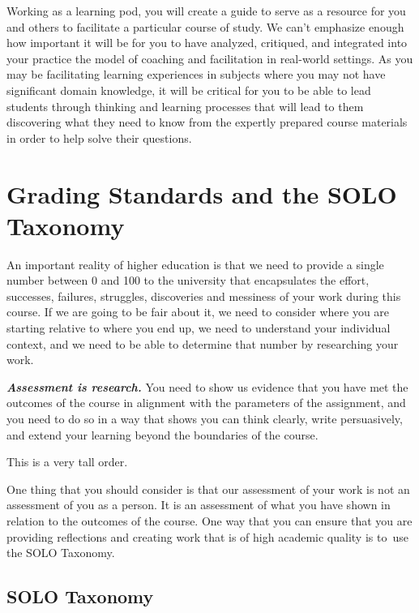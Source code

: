 \documentclass[
]{book}
\begin{document}
Working as a learning pod, you will create a guide to serve as a resource for you and others to facilitate a particular course of study. We can't emphasize enough how important it will be for you to have analyzed, critiqued, and integrated into your practice the model of coaching and facilitation in real-world settings. As you may be facilitating learning experiences in subjects where you may not have significant domain knowledge, it will be critical for you to be able to lead students through thinking and learning processes that will lead to them discovering what they need to know from the expertly prepared course materials in order to help solve their questions.

\hypertarget{grading-standards-and-the-solo-taxonomy}{%
\section*{Grading Standards and the SOLO Taxonomy}\label{grading-standards-and-the-solo-taxonomy}}

An important reality of higher education is that we need to provide a single number between 0 and 100 to the university that encapsulates the effort, successes, failures, struggles, discoveries and messiness of your work during this course. If we are going to be fair about it, we need to consider where you are starting relative to where you end up, we need to understand your individual context, and we need to be able to determine that number by researching your work.

\textbf{\emph{Assessment is research.}} You need to show us evidence that you have met the outcomes of the course in alignment with the parameters of the assignment, and you need to do so in a way that shows you can think clearly, write persuasively, and extend your learning beyond the boundaries of the course.

This is a very tall order.

One thing that you should consider is that our assessment of your work is not an assessment of you as a person. It is an assessment of what you have shown in relation to the outcomes of the course. One way that you can ensure that you are providing reflections and creating work that is of high academic quality is to~use the SOLO Taxonomy.

\hypertarget{solo-taxonomy}{%
\subsection*{SOLO Taxonomy}\label{solo-taxonomy}}
\end{document}
